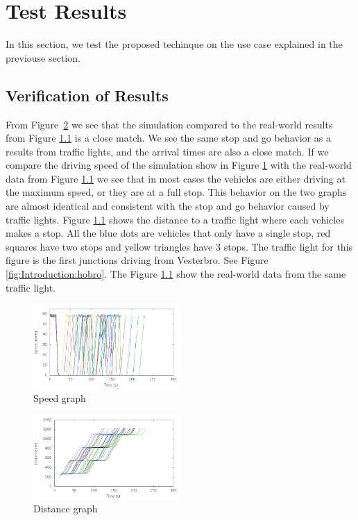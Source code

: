 \section{Test Results}
In this section, we test the proposed techinque on the use case explained in the previouse section.

\subsection{Verification of Results}
From Figure~\ref{fig:TestResults:distance0} we see that the simulation compared to the real-world results from Figure \ref{} is a close match. 
We see the same stop and go behavior as a results from traffic lights, and the arrival times are also a close match. 
If we compare the driving speed of the simulation show in Figure \ref{fig:TestResults:speed0} with the real-world data from Figure \ref{} we see that in most cases the vehicles are either driving at the maximum speed, or they are at a full stop. 
This behavior on the two graphs are almost identical and consistent with the stop and go behavior caused by traffic lights. 
Figure \ref{} shows the distance to a traffic light where each vehicles makes a stop. 
All the blue dots are vehicles that only have a single stop, red squares have two stops and yellow triangles have 3 stops.
The traffic light for this figure is the first junctions driving from Vesterbro. See Figure \ref{fig:Introduction:hobro}. The Figure \ref{} show the real-world data from the same traffic light. 

\begin{figure}[htb]
\includegraphics[width=0.5\textwidth]{images/tp0/speed0.png}
\caption{Speed graph}
\label{fig:TestResults:speed0}
\end{figure}

\begin{figure}[htb]
\includegraphics[width=0.5\textwidth]{images/tp0/distance0.png}
\caption{Distance graph}
\label{fig:TestResults:distance0}
\end{figure}


